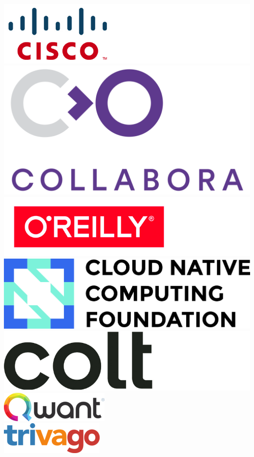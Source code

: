 \documentclass[t]{beamer}
\begin{document}
\begin{frame}
\begin{columns}[t]
	\centering
		\includegraphics[scale=1]{images/cisco.png}\\
		\includegraphics[scale=0.3]{images/collabora.png}\\
		\includegraphics[scale=1]{images/oreilly.png}
	\centering
		\includegraphics[scale=0.2]{images/cncf.png}\\
		\includegraphics[scale=0.7]{images/colt.png}\\
		\includegraphics[scale=0.4]{images/qwant.png}\\
		\includegraphics[scale=0.4]{images/trivago.png}
	\end{columns}
\end{frame}
\end{document}
